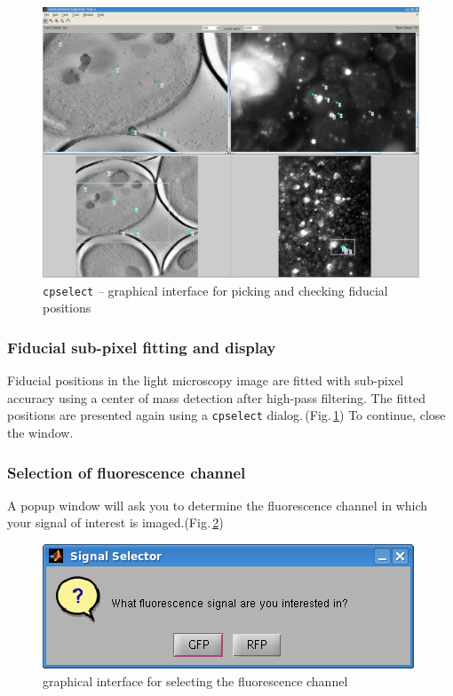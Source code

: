 \documentclass[10pt,a4paper,onepage,DIV12]{scrartcl}
\begin{document}
\begin{figure}
 \centering
 \includegraphics[width=.78\textwidth]{images/cpsel_fid1.jpg}
 \caption{\texttt{cpselect} -- graphical interface for picking and checking fiducial positions}
 \label{fig:cpsel_fid1}
\end{figure}

\subsubsection{Fiducial sub-pixel fitting and display}
Fiducial positions in the light microscopy image are fitted with sub-pixel accuracy using a center of mass detection after high-pass filtering.
The fitted positions are presented again using a \texttt{cpselect} dialog.\,(Fig.\,\ref{fig:cpsel_fid1}) To continue, close the window.

 

\subsubsection{Selection of fluorescence channel}
A popup window will ask you to determine the fluorescence channel in which your signal of interest is imaged.(Fig.\,\ref{fig:fluorsel})

\begin{figure}
 \centering
 \includegraphics[width=.38\textwidth]{images/fluorsel.png}
\caption{graphical interface for selecting the fluorescence channel}
 \label{fig:fluorsel}
\end{figure}
\end{document}
